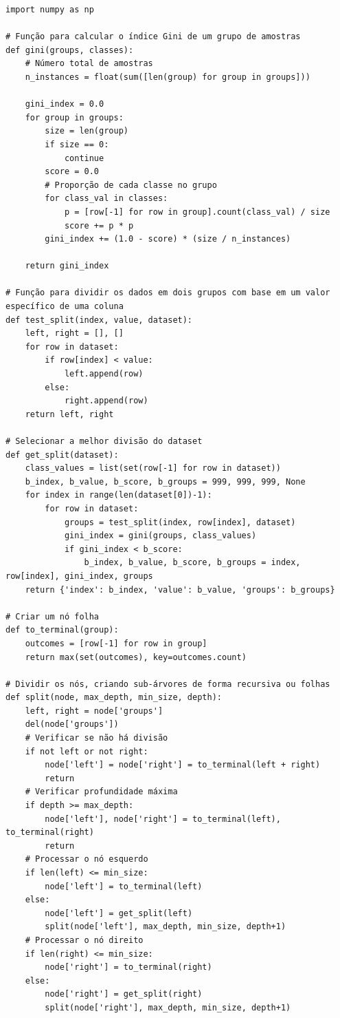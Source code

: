 \documentclass[12pt]{article}
\begin{document}
\begin{verbatim}
import numpy as np

# Função para calcular o índice Gini de um grupo de amostras
def gini(groups, classes):
    # Número total de amostras
    n_instances = float(sum([len(group) for group in groups]))
    
    gini_index = 0.0
    for group in groups:
        size = len(group)
        if size == 0:
            continue
        score = 0.0
        # Proporção de cada classe no grupo
        for class_val in classes:
            p = [row[-1] for row in group].count(class_val) / size
            score += p * p
        gini_index += (1.0 - score) * (size / n_instances)
    
    return gini_index

# Função para dividir os dados em dois grupos com base em um valor específico de uma coluna
def test_split(index, value, dataset):
    left, right = [], []
    for row in dataset:
        if row[index] < value:
            left.append(row)
        else:
            right.append(row)
    return left, right

# Selecionar a melhor divisão do dataset
def get_split(dataset):
    class_values = list(set(row[-1] for row in dataset))
    b_index, b_value, b_score, b_groups = 999, 999, 999, None
    for index in range(len(dataset[0])-1):
        for row in dataset:
            groups = test_split(index, row[index], dataset)
            gini_index = gini(groups, class_values)
            if gini_index < b_score:
                b_index, b_value, b_score, b_groups = index, row[index], gini_index, groups
    return {'index': b_index, 'value': b_value, 'groups': b_groups}

# Criar um nó folha
def to_terminal(group):
    outcomes = [row[-1] for row in group]
    return max(set(outcomes), key=outcomes.count)

# Dividir os nós, criando sub-árvores de forma recursiva ou folhas
def split(node, max_depth, min_size, depth):
    left, right = node['groups']
    del(node['groups'])
    # Verificar se não há divisão
    if not left or not right:
        node['left'] = node['right'] = to_terminal(left + right)
        return
    # Verificar profundidade máxima
    if depth >= max_depth:
        node['left'], node['right'] = to_terminal(left), to_terminal(right)
        return
    # Processar o nó esquerdo
    if len(left) <= min_size:
        node['left'] = to_terminal(left)
    else:
        node['left'] = get_split(left)
        split(node['left'], max_depth, min_size, depth+1)
    # Processar o nó direito
    if len(right) <= min_size:
        node['right'] = to_terminal(right)
    else:
        node['right'] = get_split(right)
        split(node['right'], max_depth, min_size, depth+1)


\end{verbatim}
\end{document}
